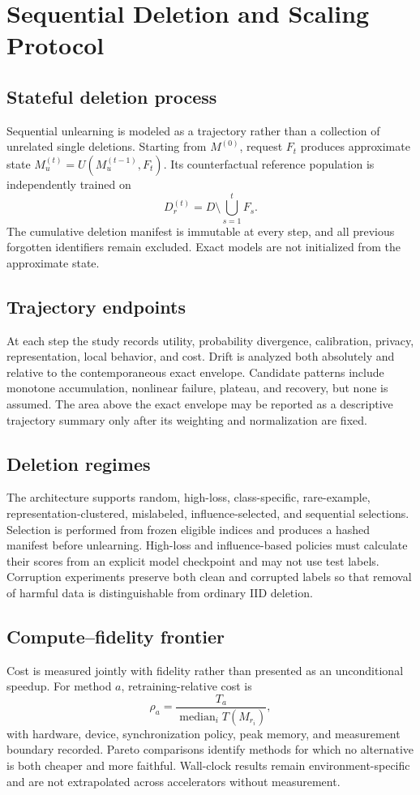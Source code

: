 \section{Sequential Deletion and Scaling Protocol}
\subsection{Stateful deletion process}
Sequential unlearning is modeled as a trajectory rather than a collection of unrelated
single deletions.  Starting from $M^{(0)}$, request $F_t$ produces approximate state
$M_u^{(t)}=U(M_u^{(t-1)},F_t)$.  Its counterfactual reference population is independently
trained on
\begin{equation}
  D_r^{(t)} = D \setminus \bigcup_{s=1}^{t} F_s.
\end{equation}
The cumulative deletion manifest is immutable at every step, and all previous forgotten
identifiers remain excluded.  Exact models are not initialized from the approximate state.

\subsection{Trajectory endpoints}
At each step the study records utility, probability divergence, calibration, privacy,
representation, local behavior, and cost.  Drift is analyzed both absolutely and relative
to the contemporaneous exact envelope.  Candidate patterns include monotone accumulation,
nonlinear failure, plateau, and recovery, but none is assumed.  The area above the exact
envelope may be reported as a descriptive trajectory summary only after its weighting and
normalization are fixed.

\subsection{Deletion regimes}
The architecture supports random, high-loss, class-specific, rare-example,
representation-clustered, mislabeled, influence-selected, and sequential selections.
Selection is performed from frozen eligible indices and produces a hashed manifest before
unlearning.  High-loss and influence-based policies must calculate their scores from an
explicit model checkpoint and may not use test labels.  Corruption experiments preserve
both clean and corrupted labels so that removal of harmful data is distinguishable from
ordinary IID deletion.

\subsection{Compute--fidelity frontier}
Cost is measured jointly with fidelity rather than presented as an unconditional speedup.
For method $a$, retraining-relative cost is
\begin{equation}
  \rho_a = \frac{T_a}{\operatorname{median}_i T(M_{r_i})},
\end{equation}
with hardware, device, synchronization policy, peak memory, and measurement boundary
recorded.  Pareto comparisons identify methods for which no alternative is both cheaper
and more faithful.  Wall-clock results remain environment-specific and are not extrapolated
across accelerators without measurement.

